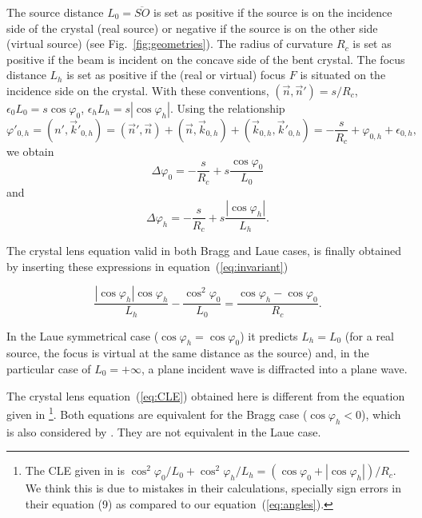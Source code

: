 \documentclass[preprint]{iucr}              %
\begin{document}
The source distance $L_0=\overline{SO}$ is set as positive if the source is on the incidence side of the crystal (real source) or negative if the source is on the other side (virtual source) (see Fig.~\ref{fig:geometries}). The radius of curvature $R_c$ is set as positive if the beam is incident on the concave side of the bent crystal. The focus distance $L_h$ is set as positive if the (real or virtual) focus $F$ is situated on the incidence side on the crystal. With these conventions, $(\vec n,\vec n')=s/R_c$, $\epsilon_0 L_0 = s \cos\varphi_0$,  $\epsilon_h L_h = s |\cos\varphi_h|$. Using the relationship
\begin{equation}
    \varphi'_{0,h} = 
    (n',  \vec k'_{0,h}) = 
    (\vec n', \vec n) + (\vec n,\vec k_{0,h}) + (\vec k_{0,h}, \vec k'_{0,h}) = -\frac{s}{R_c} + \varphi_{0,h} + \epsilon_{0,h},
\end{equation}
we obtain
\begin{equation}
\label{eq:angles}
\Delta \varphi_0 =  - \frac{s}{R_c} + s \frac{\cos\varphi_0}{L_0}
\end{equation}
and 
\begin{equation}
\label{eq:angles2}
\Delta \varphi_h = - \frac{s}{R_c} +  s \frac{|\cos\varphi_h|}{L_h}.
\end{equation}

The crystal lens equation valid in both Bragg and Laue cases, is finally obtained by inserting these expressions in equation~(\ref{eq:invariant})

\begin{equation}
\label{eq:CLE}
\frac{|\cos\varphi_h| \cos\varphi_h}{L_h} - \frac{\cos^2\varphi_0}{L_0} = \frac{\cos\varphi_h - \cos\varphi_0}{R_c}.
\end{equation}

In the Laue symmetrical case ($\cos\varphi_h=\cos\varphi_0$) it predicts $L_h=L_0$ (for a real source, the focus is virtual at the same distance as the source) and, in the particular case of $L_0=+\infty$, a plane incident wave is diffracted into a plane wave.

The crystal lens equation~(\ref{eq:CLE}) obtained here is different from the equation given in \cite{CK}\footnote{The CLE given in \cite{CK} is 
$
\cos^2\varphi_0/L_0 + \cos^2\varphi_h/L_h = (\cos\varphi_0 + |\cos\varphi_h|)/R_c$.
We think this is due to mistakes in their calculations, specially sign errors in their equation (9) as compared to our equation~(\ref{eq:angles}). 
}.
Both equations are equivalent for the Bragg case ($\cos\varphi_h<0$), which is also considered by . They are not equivalent in the Laue case.
 
\end{document}
